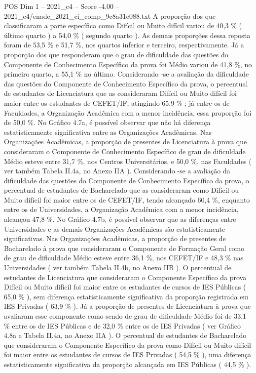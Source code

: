 \begin{textsample}{POS Dim 1 – 2021\_c4 – Score -4.00 – 2021\_c4/enade\_2021\_ci\_comp\_9c8a31e088.txt}
A proporção dos que classificaram a parte específica como Difícil ou Muito difícil variou de 40,3 \% ( último quarto ) a 54,0 \% ( segundo quarto ).
As demais proporções dessa reposta foram de 53,5 \% e 51,7 \%, nos quartos inferior e terceiro, respectivamente.
Já a proporção dos que responderam que o grau de dificuldade das questões do Componente de Conhecimento Específico da prova foi Médio variou de 41,8 \%, no primeiro quarto, a 55,1 \% no último.
Considerando -se a avaliação da dificuldade das questões do Componente de Conhecimento Específico da prova, o percentual de estudantes de Licenciatura que as consideraram Difícil ou Muito difícil foi maior entre os estudantes de CEFET/IF, atingindo 65,9 \% ; já entre os de Faculdades, a Organização Acadêmica com a menor incidência, essa proporção foi de 50,0 \%.
No Gráfico 4.7a, é possível observar que não há diferença estatisticamente significativa entre as Organizações Acadêmicas.
Nas Organizações Acadêmicas, a proporção de presentes de Licenciatura à prova que consideraram o Componente de Conhecimento Específico de grau de dificuldade Médio esteve entre 31,7 \%, nos Centros Universitários, e 50,0 \%, nas Faculdades ( ver também Tabela II.4a, no Anexo IIA ).
Considerando -se a avaliação da dificuldade das questões do Componente de Conhecimento Específico da prova, o percentual de estudantes de Bacharelado que as consideraram como Difícil ou Muito difícil foi maior entre os de CEFET/IF, tendo alcançado 60,4 \%, enquanto entre os de Universidades, a Organização Acadêmica com a menor incidência, alcançou 47,8 \%.
No Gráfico 4.7b, é possível observar que as diferenças entre Universidades e as demais Organizações Acadêmicas são estatisticamente significativas.
Nas Organizações Acadêmicas, a proporção de presentes de Bacharelado à prova que consideraram o Componente de Formação Geral como de grau de dificuldade Médio esteve entre 36,1 \%, nos CEFET/IF e 48,3 \% nas Universidades ( ver também Tabela II.4b, no Anexo IIB ).
O percentual de estudantes de Licenciatura que consideraram o Componente Específico da prova Difícil ou Muito difícil foi maior entre os estudantes de cursos de IES Públicas ( 65,0 \% ), sem diferença estatisticamente significativa da proporção registrada em IES Privadas ( 63,9 \% ).
Já a proporção de presentes de Licenciatura à prova que avaliaram esse componente como sendo de grau de dificuldade Médio foi de 33,1 \% entre os de IES Públicas e de 32,0 \% entre os de IES Privadas ( ver Gráfico 4.8a e Tabela II.4a, no Anexo IIA ).
O percentual de estudantes de Bacharelado que consideraram o Componente Específico da prova como Difícil ou Muito difícil foi maior entre os estudantes de cursos de IES Privadas ( 54,5 \% ), uma diferença estatisticamente significativa da proporção alcançada em IES Públicas ( 44,5 \% ).

\end{textsample}

